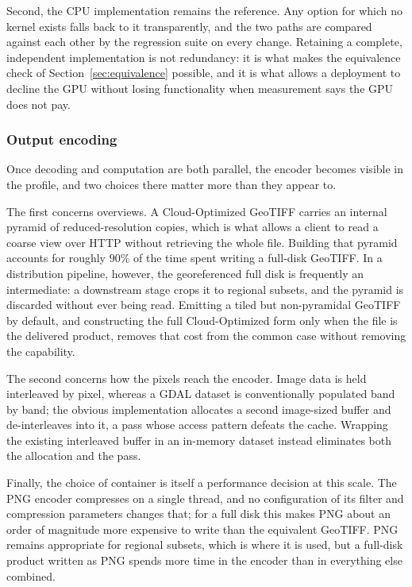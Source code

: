 \documentclass[11pt]{article}
\begin{document}
Second, the CPU implementation remains the reference. Any option for which no
kernel exists falls back to it transparently, and the two paths are compared
against each other by the regression suite on every change. Retaining a
complete, independent implementation is not redundancy: it is what makes the
equivalence check of Section~\ref{sec:equivalence} possible, and it is what
allows a deployment to decline the GPU without losing functionality when
measurement says the GPU does not pay.

\subsubsection{Output encoding}
\label{sec:output}

Once decoding and computation are both parallel, the encoder becomes visible in
the profile, and two choices there matter more than they appear to.

The first concerns overviews. A Cloud-Optimized GeoTIFF carries an internal
pyramid of reduced-resolution copies, which is what allows a client to read a
coarse view over HTTP without retrieving the whole file. Building that pyramid
accounts for roughly $90\%$ of the time spent writing a full-disk GeoTIFF. In a
distribution pipeline, however, the georeferenced full disk is frequently an
intermediate: a downstream stage crops it to regional subsets, and the pyramid
is discarded without ever being read. Emitting a tiled but non-pyramidal
GeoTIFF by default, and constructing the full Cloud-Optimized form only when
the file is the delivered product, removes that cost from the common case
without removing the capability.

The second concerns how the pixels reach the encoder. Image data is held
interleaved by pixel, whereas a GDAL dataset is conventionally populated band
by band; the obvious implementation allocates a second image-sized buffer and
de-interleaves into it, a pass whose access pattern defeats the cache. Wrapping
the existing interleaved buffer in an in-memory dataset instead eliminates both
the allocation and the pass.

Finally, the choice of container is itself a performance decision at this
scale. The PNG encoder compresses on a single thread, and no configuration of
its filter and compression parameters changes that; for a full disk this makes
PNG about an order of magnitude more expensive to write than the equivalent
GeoTIFF. PNG remains appropriate for regional subsets, which is where it is
used, but a full-disk product written as PNG spends more time in the encoder
than in everything else combined.
\end{document}
